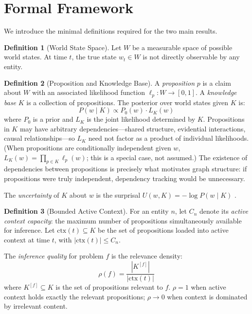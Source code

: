 \documentclass[11pt]{article}
\theoremstyle{definition}
\newtheorem{definition}{Definition}
\begin{document}
\section{Formal Framework}
\label{sec:framework}

We introduce the minimal definitions required for the two main results.

\begin{definition}[World State Space]
\label{def:world}
Let $W$ be a measurable space of possible world states. At time $t$, the
true state $w_t \in W$ is not directly observable by any entity.
\end{definition}

\begin{definition}[Proposition and Knowledge Base]
\label{def:knowledge}
A \emph{proposition} $p$ is a claim about $W$ with an associated
likelihood function $\ell_p : W \to [0,1]$. A \emph{knowledge base} $K$
is a collection of propositions. The posterior over world states given
$K$ is:
\[
P(w \mid K) \propto P_0(w) \cdot L_K(w)
\]
where $P_0$ is a prior and $L_K$ is the joint likelihood determined by
$K$. Propositions in $K$ may have arbitrary dependencies---shared
structure, evidential interactions, causal relationships---so $L_K$ need
not factor as a product of individual likelihoods. (When propositions
are conditionally independent given $w$, $L_K(w) = \prod_{p \in K}
\ell_p(w)$; this is a special case, not assumed.) The existence of
dependencies between propositions is precisely what motivates graph
structure: if propositions were truly independent, dependency tracking
would be unnecessary.

The \emph{uncertainty} of $K$ about $w$ is the
surprisal $U(w, K) = -\log P(w \mid K)$ \cite{Shannon1948, Cover2006}.
\end{definition}

\begin{definition}[Bounded Active Context]
\label{def:context}
For an entity $n$, let $C_n$ denote its \emph{active context capacity}:
the maximum number of propositions simultaneously available for
inference. Let
$\mathrm{ctx}(t) \subseteq K$ be the set of propositions loaded into
active context at time $t$, with $|\mathrm{ctx}(t)| \leq C_n$.

The \emph{inference quality} for problem $f$ is the relevance density:
\[
\rho(f) = \frac{|K^{[f]}|}{|\mathrm{ctx}(t)|}
\]
where $K^{[f]} \subseteq K$ is the set of propositions relevant to $f$.
$\rho = 1$ when active context holds exactly the relevant propositions;
$\rho \to 0$ when context is dominated by irrelevant content.
\end{definition}
\end{document}
